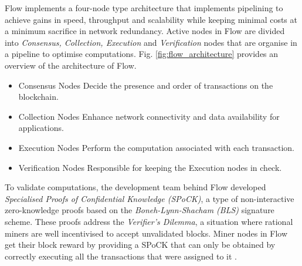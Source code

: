 \documentclass[../main.tex]{subfiles}
\begin{document}
Flow implements a four-node type architecture that implements pipelining to achieve gains in speed, throughput and scalability while keeping minimal costs at a minimum sacrifice in network redundancy. Active nodes in Flow are divided into \textit{Consensus, Collection, Execution} and \textit{Verification} nodes that are organise in a pipeline to optimise computations. Fig. \ref{fig:flow_architecture} provides an overview of the architecture of Flow.

\begin{itemize}
    \item{Consensus Nodes} Decide the presence and order of transactions on the blockchain.
    \item {Collection Nodes} Enhance network connectivity and data availability for applications.
    \item {Execution Nodes} Perform the computation associated with each transaction.
    \item {Verification Nodes} Responsible for keeping the Execution nodes in check.
\end{itemize}

To validate computations, the development team behind Flow developed \textit{Specialised Proofs of Confidential Knowledge (SPoCK)}, a type of non-interactive zero-knowledge proofs based on the \textit{Boneh-Lynn-Shacham (BLS)} signature scheme. These proofs address the \textit{Verifier's Dilemma}, a situation where rational miners are well incentivised to accept unvalidated blocks. Miner nodes in Flow get their block reward by providing a SPoCK that can only be obtained by correctly executing all the transactions that were assigned to it \cite{Ben2020}.
\end{document}
